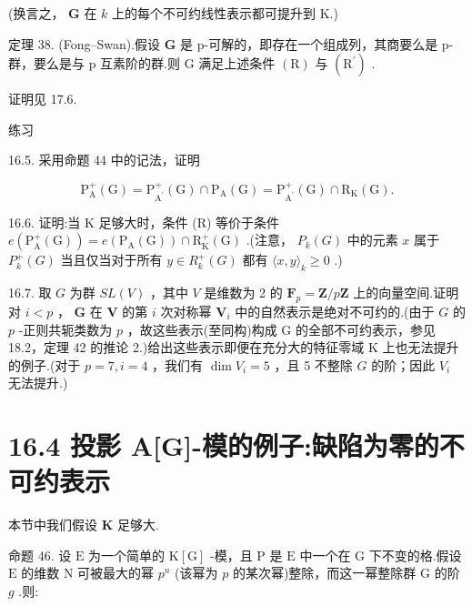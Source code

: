 \documentclass[10pt]{article}
\begin{document}
(换言之， \(\mathbf{G}\) 在 \(k\) 上的每个不可约线性表示都可提升到 K.)

定理 38. (Fong–Swan).假设 \(\mathbf{G}\) 是 p-可解的，即存在一个组成列，其商要么是 p-群，要么是与 p 互素阶的群.则 \(\mathrm{G}\) 满足上述条件 \(\left( \mathrm{R}\right)\) 与 \(\left( {\mathrm{R}}^{\prime }\right)\) .

证明见 17.6.

练习

16.5. 采用命题 44 中的记法，证明

\[
{\mathrm{P}}_{\mathrm{A}}^{ + }\left( \mathrm{G}\right)  = {\mathrm{P}}_{{\mathrm{A}}^{\prime }}^{ + }\left( \mathrm{G}\right)  \cap  {\mathrm{P}}_{\mathrm{A}}\left( \mathrm{G}\right)  = {\mathrm{P}}_{{\mathrm{A}}^{\prime }}^{ + }\left( \mathrm{G}\right)  \cap  {\mathrm{R}}_{\mathrm{K}}\left( \mathrm{G}\right) .
\]

16.6. 证明:当 K 足够大时，条件 (R) 等价于条件 \(e\left( {{\mathrm{P}}_{\mathrm{A}}^{ + }\left( \mathrm{G}\right) }\right)  = e\left( {{\mathrm{P}}_{\mathrm{A}}\left( \mathrm{G}\right) }\right)  \cap  {\mathrm{R}}_{\mathrm{K}}^{ + }\left( \mathrm{G}\right)\) .(注意， \({P}_{k}\left( G\right)\) 中的元素 \(x\) 属于 \({P}_{k}^{ + }\left( G\right)\) 当且仅当对于所有 \(y \in  {R}_{k}^{ + }\left( G\right)\) 都有 \(\langle x,y{\rangle }_{k} \geq  0\) .)

16.7. 取 \(G\) 为群 \({SL}\left( V\right)\) ，其中 \(V\) 是维数为 2 的 \({\mathbf{F}}_{p} = \mathbf{Z}/p\mathbf{Z}\) 上的向量空间.证明对 \(i < p\) ， \(\mathbf{G}\) 在 \(\mathbf{V}\) 的第 \(i\) 次对称幂 \({\mathbf{V}}_{i}\) 中的自然表示是绝对不可约的.(由于 \(G\) 的 \(p\) -正则共轭类数为 \(p\) ，故这些表示(至同构)构成 G 的全部不可约表示，参见 18.2，定理 42 的推论 2.)给出这些表示即便在充分大的特征零域 K 上也无法提升的例子.(对于 \(p = 7,i = 4\) ，我们有 \(\dim {V}_{i} = 5\) ，且 5 不整除 \(G\) 的阶；因此 \({V}_{i}\) 无法提升.)

\section*{16.4 投影 A[G]-模的例子:缺陷为零的不可约表示}

本节中我们假设 \(\mathbf{K}\) 足够大.

命题 46. 设 \(\mathrm{E}\) 为一个简单的 \(\mathrm{K}\left\lbrack  \mathrm{G}\right\rbrack\) -模，且 \(\mathrm{P}\) 是 \(\mathrm{E}\) 中一个在 G 下不变的格.假设 \(\mathrm{E}\) 的维数 \(\mathrm{N}\) 可被最大的幂 \({p}^{n}\) (该幂为 \(p\) 的某次幂)整除，而这一幂整除群 \(\mathrm{G}\) 的阶 \(g\) .则:
\end{document}
